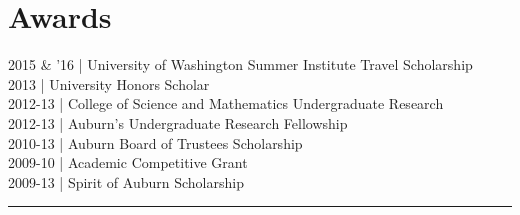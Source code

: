 \documentclass[]{deedy-resume-openfont}
\begin{document}
\begin{minipage}[t]{0.32\textwidth}

\section{Awards} 
2015 \& '16 | University of Washington Summer Institute Travel Scholarship \\
2013 |	      University Honors Scholar \\
2012-13 |	      College of Science and Mathematics Undergraduate Research \\
2012-13 |	      Auburn’s Undergraduate Research Fellowship \\
2010-13 |		 Auburn Board of Trustees Scholarship \\
2009-10 |		 Academic Competitive Grant \\
2009-13 |	 Spirit of Auburn Scholarship \\

\sectionsep


%
%

\end{minipage} 
\hfill
\begin{minipage}[t]{0.02\textwidth} 

\rule[-9.25in]{0.025cm}{9.25in}


%
%

\end{minipage} 
\hfill
\end{document}
